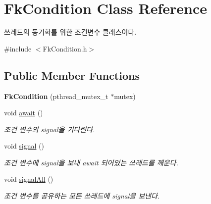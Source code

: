 \hypertarget{class_fk_condition}{}\section{Fk\+Condition Class Reference}
\label{class_fk_condition}


쓰레드의 동기화를 위한 조건변수 클래스이다.  




{\ttfamily \#include $<$Fk\+Condition.\+h$>$}

\subsection*{Public Member Functions}
\begin{DoxyCompactItemize}
\item 
\hypertarget{class_fk_condition_ae81f595053d20cfc298d38ffdf88272b}{}{\bfseries Fk\+Condition} (pthread\+\_\+mutex\+\_\+t $\ast$mutex)\label{class_fk_condition_ae81f595053d20cfc298d38ffdf88272b}

\item 
\hypertarget{class_fk_condition_abc5e82d536a0e4635b95796e22ae2f21}{}void \hyperlink{class_fk_condition_abc5e82d536a0e4635b95796e22ae2f21}{await} ()\label{class_fk_condition_abc5e82d536a0e4635b95796e22ae2f21}

\begin{DoxyCompactList}\small\item\em 조건 변수의 signal을 기다린다. \end{DoxyCompactList}\item 
\hypertarget{class_fk_condition_a5a7c934f9cce89da6e5e2871154021c7}{}void \hyperlink{class_fk_condition_a5a7c934f9cce89da6e5e2871154021c7}{signal} ()\label{class_fk_condition_a5a7c934f9cce89da6e5e2871154021c7}

\begin{DoxyCompactList}\small\item\em 조건 변수에 signal을 보내 await 되어있는 쓰레드를 깨운다. \end{DoxyCompactList}\item 
\hypertarget{class_fk_condition_a2428115dd2c3c4b1b199a76064c6826d}{}void \hyperlink{class_fk_condition_a2428115dd2c3c4b1b199a76064c6826d}{signal\+All} ()\label{class_fk_condition_a2428115dd2c3c4b1b199a76064c6826d}

\begin{DoxyCompactList}\small\item\em 조건 변수를 공유하는 모든 쓰레드에 signal을 보낸다. \end{DoxyCompactList}\end{DoxyCompactItemize}


